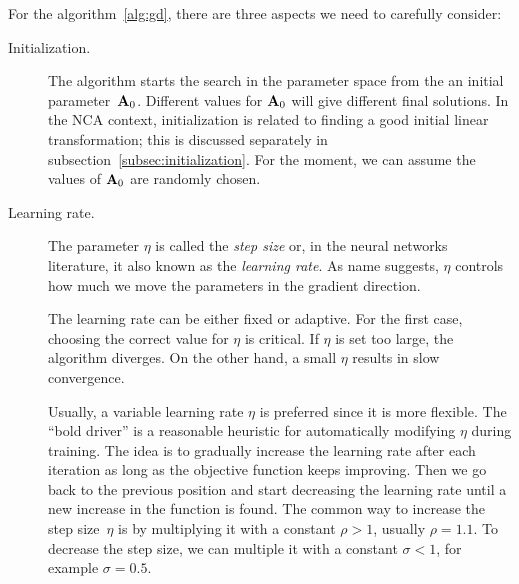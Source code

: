 	For the algorithm~\ref{alg:gd}, there are three aspects we need to carefully consider:
	\begin{description}
	 \item[Initialization.] The algorithm starts the search in the parameter space from the an initial parameter~$\mathbf{A}_0$. Different values for $\mathbf{A}_0$ will give different final solutions. In the NCA context, initialization is related to finding a good initial linear transformation; this is discussed  separately in subsection~\ref{subsec:initialization}. For the moment, we can assume the values of $\mathbf{A}_0$ are randomly chosen.
	 \item[Learning rate.] The parameter $\eta$ is called the \textit{step size} or, in the neural networks literature, it also known as the \textit{learning rate}. As name suggests, $\eta$ controls how much we move the parameters in the gradient direction. 

	The learning rate can be either fixed or adaptive. For the first case, choosing the correct value for $\eta$ is critical. If $\eta$ is set too large, the algorithm diverges. On the other hand, a small $\eta$ results in slow convergence. 

	Usually, a variable learning rate $\eta$ is preferred since it is more flexible. The ``bold driver'' \citep{vogl1988} is a reasonable heuristic for automatically modifying $\eta$ during training. The idea is to gradually increase the learning rate after each iteration as long as the objective function keeps improving. Then we go back to the previous position and start decreasing the learning rate until a new increase in the function is found. The common way to increase the step size~$\eta$ is by multiplying it with a constant $\rho>1$, usually $\rho=1.1$. To decrease the step size, we can multiple it with a constant $\sigma<1$, for example $\sigma = 0.5$.

	

\end{description}

